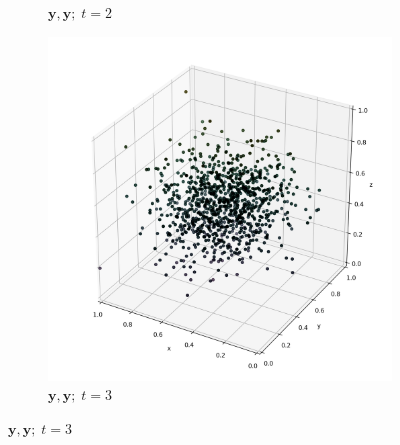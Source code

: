 \documentclass[12pt, aspectratio=169]{beamer}
\newcommand{\yy}{\mathbf{y}}
\begin{document}
\begin{frame}
\begin{figure}[H]
\begin{subfigure}{0.2\textwidth}
			\caption{$\yy, \yy; \; t=2$}
			\label{fig:5}
		\end{subfigure}\hfil
		\begin{subfigure}{0.2\textwidth}
			\includegraphics[width=\linewidth]{resources/Y_Y_3_simulated.png}
			\caption{$\yy, \yy; \; t=3$}
			\label{fig:6}
		\end{subfigure}
	\end{figure}
\end{frame}
\end{document}
